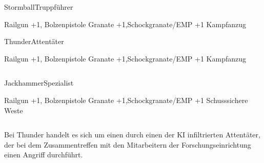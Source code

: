 \begin{column}[l]{0.45}
    \begin{nscsheet}[h]{Stormball\newline{}Truppführer}
        \nscstats[ATT=3,AGG=3,CON=2]
        \nscruler
        \begin{nscinventory}
            \nscitem[Waffen] Railgun +1, Bolzenpistole
            \nscitem[Granaten] Granate +1,\newline{}Schockgranate/EMP +1
            \nscitem[Rüstung] Kampfanzug
        \end{nscinventory}
    \end{nscsheet}

    \begin{nscsheet}[h]{Thunder\newline{}Attentäter}
        \nscstats[ATT=3,AGG=3,CON=2]
        \nscruler
        \begin{nscinventory}
            \nscitem[Waffen] Railgun +1, Bolzenpistole
            \nscitem[Granaten] Granate +1,\newline{}Schockgranate/EMP +1
            \nscitem[Rüstung] Kampfanzug
        \end{nscinventory}
    \end{nscsheet}
\end{column}
\begin{column}[r]{0.45}
    \begin{nscsheet}[h]{Jackhammer\newline{}Spezialist}
        \nscstats[ATT=2,AGG=2,DEX=3,CON=2]
        \nscruler
        \begin{nscinventory}
            \nscitem[Waffen] Railgun +1, Bolzenpistole
            \nscitem[Granaten] Granate +1,\newline{}Schockgranate/EMP +1
            \nscitem[Rüstung] Schusssichere Weste
        \end{nscinventory}
    \end{nscsheet}
\end{column}

\medskip
Bei Thunder handelt es sich um einen durch einen der KI infiltrierten Attentäter, der bei dem Zusammentreffen mit den 
Mitarbeitern der Forschungseinrichtung einen Angriff durchführt.
